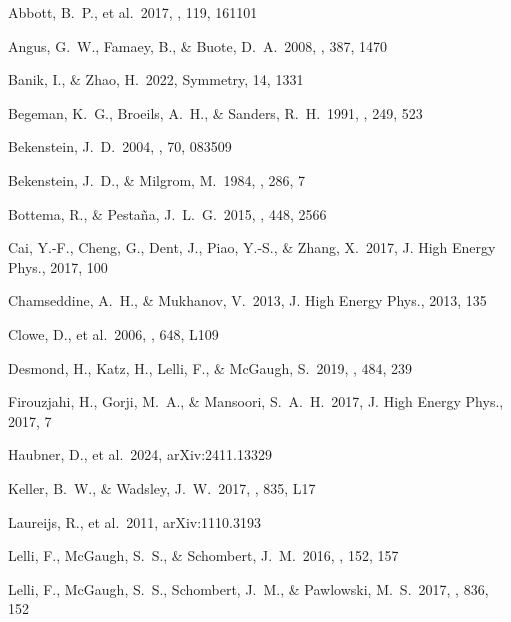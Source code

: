 \documentclass{aa}
\newcommand{\jhep}{J. High Energy Phys.}
\begin{document}
\begin{thebibliography}{}

  Abbott, B.~P., et al.\ 2017, \prl, 119, 161101

  Angus, G.~W., Famaey, B., \& Buote, D.~A.\ 2008, \mnras, 387, 1470

  Banik, I., \& Zhao, H.\ 2022, Symmetry, 14, 1331

  Begeman, K.~G., Broeils, A.~H., \& Sanders, R.~H.\ 1991, \mnras, 249, 523

  Bekenstein, J.~D.\ 2004, \prd, 70, 083509

  Bekenstein, J.~D., \& Milgrom, M.\ 1984, \apj, 286, 7

  Bottema, R., \& Pestaña, J.~L.~G.\ 2015, \mnras, 448, 2566

  Cai, Y.-F., Cheng, G., Dent, J., Piao, Y.-S., \& Zhang, X.\ 2017,
  \jhep, 2017, 100

  Chamseddine, A.~H., \& Mukhanov, V.\ 2013, \jhep, 2013, 135

  Clowe, D., et al.\ 2006, \apjl, 648, L109

  Desmond, H., Katz, H., Lelli, F., \& McGaugh, S.\ 2019, \mnras, 484, 239

  Firouzjahi, H., Gorji, M.~A., \& Mansoori, S.~A.~H.\ 2017, \jhep, 2017, 7

  Haubner, D., et al.\ 2024, arXiv:2411.13329

  Keller, B.~W., \& Wadsley, J.~W.\ 2017, \apjl, 835, L17

  Laureijs, R., et al.\ 2011, arXiv:1110.3193

  Lelli, F., McGaugh, S.~S., \& Schombert, J.~M.\ 2016, \aj, 152, 157

  Lelli, F., McGaugh, S.~S., Schombert, J.~M., \& Pawlowski, M.~S.\ 2017,
  \apj, 836, 152


\end{thebibliography}
\end{document}
